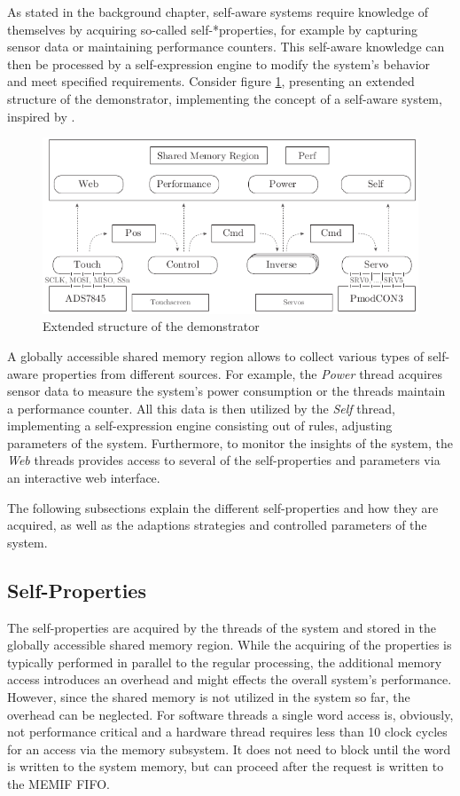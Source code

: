 As stated in the background chapter, self-aware systems require knowledge of
themselves by acquiring so-called self-*properties, for example by capturing
sensor data or maintaining performance counters. This self-aware knowledge can
then be processed by a self-expression engine to modify the system's behavior
and meet specified requirements. Consider figure \ref{fig:demo_selfaware},
presenting an extended structure of the demonstrator, implementing the concept
of a self-aware system, inspired by \citep{AHL14}.
\begin{figure}
	\centering
	\includegraphics{../figures/demo_selfaware}
	\caption{Extended structure of the demonstrator}
	\label{fig:demo_selfaware}
\end{figure}
A globally accessible shared memory region allows to collect various types of
self-aware properties from different sources. For example, the \emph{Power}
thread acquires sensor data to measure the system's power consumption or the
threads maintain a performance counter. All this data is then utilized by the
\emph{Self} thread, implementing a self-expression engine consisting out of
rules, adjusting parameters of the system. Furthermore, to monitor the
insights of the system, the \emph{Web} threads provides access to several of
the self-properties and parameters via an interactive web interface.

The following subsections explain the different self-properties and how they
are acquired, as well as the adaptions strategies and controlled parameters of
the system.

\subsection{Self-Properties}

The self-properties are acquired by the threads of the system and stored in
the globally accessible shared memory region. While the acquiring of the
properties is typically performed in parallel to the regular processing, the
additional memory access introduces an overhead and might effects the
overall system's performance. However, since the shared memory is not utilized
in the system so far, the overhead can be neglected. For software threads a
single word access is, obviously, not performance critical and a hardware
thread requires less than 10 clock cycles for an access via the memory
subsystem. It does not need to block until the word is written to the system
memory, but can proceed after the request is written to the \ac{MEMIF}
\ac{FIFO}.

